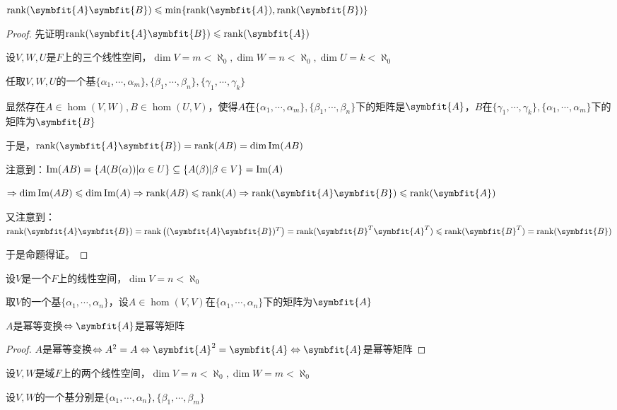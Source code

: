\documentclass[12pt, a4paper, oneside, UTF8]{ctexbook}
\begin{document}
\begin{para}{0}
\begin{proposition}
						$\rank(\symbfit{A}\symbfit{B})\leqslant \min\{\rank(\symbfit{A}),\rank(\symbfit{B})\}$
					\end{proposition}
					\begin{proof}
						先证明$\rank(\symbfit{A}\symbfit{B})\leqslant \rank(\symbfit{A})$

						设$V,W,U$是$F$上的三个线性空间，$\dim V = m < \aleph_0,\dim W = n < \aleph_0,\dim U = k < \aleph_0$

						任取$V,W,U$的一个基$\{\alpha_1,\cdots,\alpha_m\},\{\beta_1,\cdots,\beta_n\},\{\gamma_1,\cdots,\gamma_k\}$

						显然存在$A \in \hom(V,W),B \in \hom(U,V)$，使得$A$在$\{\alpha_1,\cdots,\alpha_m\},\{\beta_1,\cdots,\beta_n\}$下的矩阵是$\symbfit{A}$，$B$在$\{\gamma_1,\cdots,\gamma_k\},\{\alpha_1,\cdots,\alpha_m\}$下的矩阵为$\symbfit{B}$

						于是，$\rank(\symbfit{A}\symbfit{B})=\rank(AB)=\dim \im(AB)$

						注意到：$\operatorname{Im}(AB)=\{A(B(\alpha ))|\alpha \in U\} \subseteq \{A(\beta )|\beta \in V\} = \operatorname{Im}(A)$

						$\Rightarrow \dim \im (AB) \leqslant \dim \im (A) \Rightarrow \rank(AB) \leqslant \rank(A) \Rightarrow \rank(\symbfit{A}\symbfit{B})\leqslant \rank(\symbfit{A})$

						又注意到：$\rank(\symbfit{A}\symbfit{B})=\rank\left((\symbfit{A}\symbfit{B})^T\right)=\rank(\symbfit{B}^T\symbfit{A}^T)\leqslant \rank(\symbfit{B}^T)=\rank(\symbfit{B})$

						于是命题得证。
					\end{proof}
				\point{}
					\begin{proposition}
						设$V$是一个$F$上的线性空间，$\dim V =n < \aleph_0$

						取$V$的一个基$\{\alpha_1,\cdots,\alpha_n\}$，设$A \in \hom(V,V)$在$\{\alpha_1,\cdots,\alpha_n\}$下的矩阵为$\symbfit{A}$

						$A$是幂等变换$\Leftrightarrow \symbfit{A}$是幂等矩阵
					\end{proposition}
					\begin{proof}
						$A$是幂等变换$\Leftrightarrow A^2 = A \Leftrightarrow \symbfit{A}^2 = \symbfit{A} \Leftrightarrow \symbfit{A}$是幂等矩阵
					\end{proof}
				\point{}
					\begin{proposition}
						设$V,W$是域$F$上的两个线性空间，$\dim V = n < \aleph_0,\dim W = m < \aleph_0$

						设$V,W$的一个基分别是$\{\alpha _1,\cdots,\alpha _n\},\{\beta _1,\cdots,\beta _m\}$


\end{proposition}
\end{para}
\end{document}
